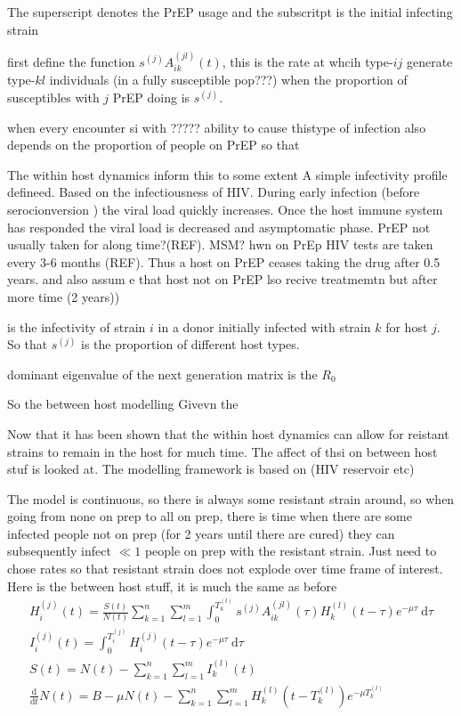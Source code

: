 \documentclass[DIV=15]{scrartcl}
\begin{document}
The superscript denotes the PrEP  usage and the subscritpt  is the initial infecting strain

first define the function $s^{(j)}A^{(jl)}_{ik}(t)$, this is the rate at whcih type-$ij$ generate  type-$kl$ individuals (in a fully susceptible pop???) when the proportion  of susceptibles with $j$ PrEP doing is $s^{(j)}$.

when every encounter si with ????? ability to cause thistype of infection also depends on the proportion of people on PrEP so that 

The within host dynamics inform this to  some extent 
A simple infectivity profile defineed. Based on the infectiousness of  HIV. During early infection (before serocionversion  ) the viral load quickly  increases. Once the host immune system has responded the viral load is decreased and asymptomatic phase. PrEP not usually taken for   along time?(REF). MSM? hwn on PrEp HIV tests are taken every 3-6 months  (REF). Thus a host on PrEP ceases taking the drug after 0.5 years. and also  assum e  that host not on PrEP lso recive treatmemtn but after more time (2 years))


 is the infectivity of strain $i$ in a donor initially infected with strain $k$ for host $j$.  So that $s^{(j)}$ is the proportion of different host types.







dominant eigenvalue of the next generation matrix is the $R_0$ \cite{diekmann2013}


So the between host modelling Givevn the


Now that it has been shown that the within host dynamics can allow  for reistant strains to remain in the  host for much time. The affect of thsi on between host stuf  is looked at. The modelling framework is based on (HIV reservoir etc)


The model is continuous, so there is always some resistant strain around, so when going from none on prep  to all on prep, there is time when there are some infected people not on prep (for 2 years until there are cured) they can subsequently infect $\ll 1$   people on prep with the resistant strain. Just need to chose rates so that resistant strain does not explode over time frame of interest.  Here is the between host stuff, it is much the same as before
\begin{gather*}
H^{(j)}_{i}(t) = \frac{S(t)}{N(t)}  \sum_{k=1}^n \sum_{l=1}^m  \int_0^{T^{(l)}_{k}} s^{(j)} A^{(jl)}_{ik}(\tau) H^{(l)}_{k}(t-\tau)e^{-\mu \tau} \ \text{d}\tau \\
I_i^{(j)}(t) = \int_0^{T_i^{(j)}}  H_i^{(j)}(t-\tau)e^{-\mu \tau} \  \text{d}\tau \\
S(t) = N(t) -  \sum_{k=1}^n \sum_{l=1}^m  I^{(l)}_k(t) \\
\frac{\text{d}}{\text{d} t}  N(t) = B- \mu N(t) -\sum_{k=1}^n \sum_{l=1}^m  H_k^{(l)}(t-T_k^{(l)})e^{-\mu T_k^{(l)}} 
\end{gather*}
\end{document}
